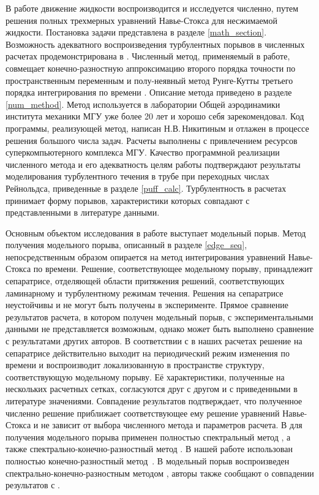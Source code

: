 В работе движение жидкости воспроизводится и исследуется численно, путем решения полных трехмерных уравнений Навье-Стокса для несжимаемой жидкости. Постановка задачи представлена в разделе \ref{math_section}. Возможность адекватного воспроизведения турбулентных порывов в численных расчетах продемонстрирована в \cite{Priymak2004}. Численный метод, применяемый в работе, совмещает конечно-разностную аппроксимацию второго порядка точности по пространственным переменным и полу-неявный метод Рунге-Кутты третьего порядка интегрирования по времени \cite{Nikitin2006, Nikitin2006third}. Описание метода приведено в разделе \ref{num_method}. Метод используется в лаборатории Общей аэродинамики института механики МГУ уже более 20 лет и хорошо себя зарекомендовал. Код программы, реализующей метод, написан Н.В.\,Никитиным и отлажен в процессе решения большого числа задач. Расчеты выполнены с привлечением ресурсов суперкомпьютерного комплекса МГУ. Качество программной реализации численного метода и его адекватность целям работы подтверждают результаты моделирования турбулентного течения в трубе при переходных числах Рейнольдса, приведенные в разделе \ref{puff_calc}. Турбулентность в расчетах принимает форму порывов, характеристики которых совпадают с представленными в литературе данными. 

Основным объектом исследования в работе выступает модельный порыв. Метод получения модельного порыва, описанный в разделе \ref{edge_seq}, непосредственным образом опирается на метод интегрирования уравнений Навье-Сток\-са по времени. Решение, соответствующее модельному порыву, принадлежит сепаратрисе, отделяющей области притяжения решений, соответствующих ламинарному и турбулентному режимам течения. Решения на сепаратрисе неустойчивы и не могут быть получены в эксперименте. Прямое сравнение результатов расчета, в котором получен модельный порыв, с экспериментальными данными не представляется возможным, однако может быть выполнено сравнение с результатами других авторов. В соответствии с \cite{Avila2013} в наших расчетах решение на сепаратрисе действительно выходит на периодический режим изменения по времени и воспроизводит локализованную в пространстве структуру, соответствующую модельному порыву. Её характеристики, полученные на нескольких расчетных сетках, согласуются друг с другом и с приведенными в литературе значениями. Совпадение результатов подтверждает, что полученное численно решение приближает соответствующее ему решение уравнений Навье-Стокса и не зависит от выбора численного метода и параметров расчета. В \cite{Avila2013} для получения модельного порыва применен полностью спектральный метод \cite{Meseguer2007}, а также спектрально-конечно-разностный метод \cite{Willis2009}. В нашей работе использован полностью конечно-разностный метод~\cite{Nikitin2006}. В \cite{Chantry2014} модельный порыв воспроизведен спектрально-конечно-разност\-ным методом \cite{Willis2009}, авторы также сообщают о совпадении результатов с \cite{Avila2013}. 

